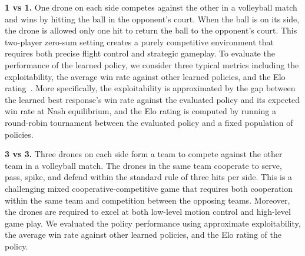 \textbf{1 vs 1.}
One drone on each side competes against the other in a volleyball match and wins by hitting the ball in the opponent's court. When the ball is on its side, the drone is allowed only one hit to return the ball to the opponent's court. This two-player zero-sum setting creates a purely competitive environment that requires both precise flight control and strategic gameplay.
To evaluate the performance of the learned policy, we consider three typical metrics including the exploitability, the average win rate against other learned policies, and the Elo rating~\cite{elo1978rating}. More specifically, the exploitability is approximated by the gap between the learned best response’s win rate against the evaluated policy and its expected win rate at Nash equilibrium, and the Elo rating is computed by running a round-robin tournament between the evaluated policy and a fixed population of policies.


\textbf{3 vs 3.}
Three drones on each side form a team to compete against the other team in a volleyball match. The drones in the same team cooperate to serve, pass, spike, and defend within the standard rule of three hits per side. This is a challenging mixed cooperative-competitive game that requires both cooperation within the same team and competition between the opposing teams.
Moreover, the drones are required to excel at both low-level motion control and high-level game play.  
We evaluated the policy performance using approximate exploitability, the average win rate against other learned policies, and the Elo rating of the policy.

